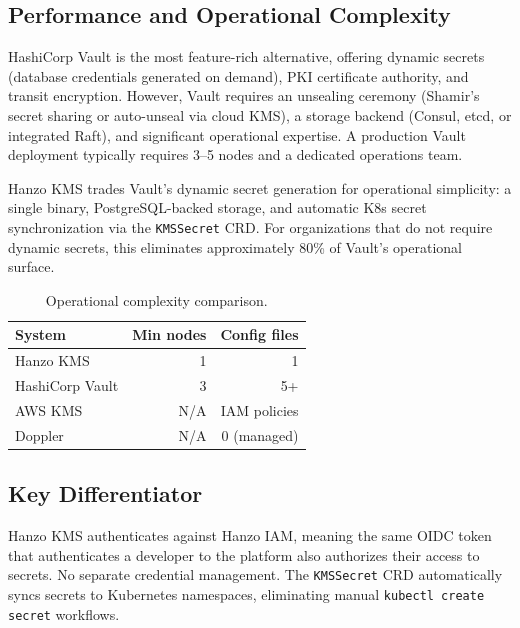 \subsection{Performance and Operational Complexity}

HashiCorp Vault is the most feature-rich alternative, offering dynamic secrets (database credentials generated on demand), PKI certificate authority, and transit encryption. However, Vault requires an unsealing ceremony (Shamir's secret sharing or auto-unseal via cloud KMS), a storage backend (Consul, etcd, or integrated Raft), and significant operational expertise. A production Vault deployment typically requires 3--5 nodes and a dedicated operations team.

Hanzo KMS trades Vault's dynamic secret generation for operational simplicity: a single binary, PostgreSQL-backed storage, and automatic K8s secret synchronization via the \texttt{KMSSecret} CRD. For organizations that do not require dynamic secrets, this eliminates approximately 80\% of Vault's operational surface.

\begin{table}[H]
\centering
\caption{Operational complexity comparison.}
\footnotesize
\begin{tabular}{@{}lrr@{}}
\toprule
System & Min nodes & Config files \\
\midrule
Hanzo KMS & 1 & 1 \\
HashiCorp Vault & 3 & 5+ \\
AWS KMS & N/A & IAM policies \\
Doppler & N/A & 0 (managed) \\
\bottomrule
\end{tabular}
\end{table}

\subsection{Key Differentiator}

Hanzo KMS authenticates against Hanzo IAM, meaning the same OIDC token that authenticates a developer to the platform also authorizes their access to secrets. No separate credential management. The \texttt{KMSSecret} CRD automatically syncs secrets to Kubernetes namespaces, eliminating manual \texttt{kubectl create secret} workflows.

